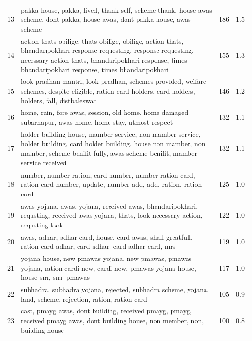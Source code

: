 \begin{table}[htbp]
\begin{tabular}{rlp{7cm}r}
13 & pakka house, pakka, lived, thank self, scheme thank, house awas scheme, dont pakka, house awas, dont pakka house, awas scheme & 186 & 1.5 \\
14 & action thats obilige, thats obilige, obilige, action thats, bhandaripokhari response requesting, response requesting, necessary action thats, bhandaripokhari response, times bhandaripokhari response, times bhandaripokhari & 155 & 1.3 \\
15 & look pradhan mantri, look pradhan, schemes provided, welfare schemes, despite eligible, ration card holders, card holders, holders, fall, distbaleswar & 146 & 1.2 \\
16 & home, rain, fore awas, session, old home, home damaged, subarnapur, awas home, home stay, utmost respect & 132 & 1.1 \\
17 & holder building house, mamber service, non mamber service, holder building, card holder building, house non mamber, non mamber, scheme benifit fully, awas scheme benifit, mamber service received & 132 & 1.1 \\
18 & number, number ration, card number, number ration card, ration card number, update, number add, add, ration, ration card & 125 & 1.0 \\
19 & awas yojana, awas, yojana, received awas, bhandaripokhari, requsting, received awas yojana, thats, look necessary action, requsting look & 122 & 1.0 \\
20 & awas, adhar, adhar card, house, card awas, shall greatfull, ration card adhar, card adhar, card adhar card, mrs & 119 & 1.0 \\
21 & yojana house, new pmawas yojana, new pmawas, pmawas yojana, ration cardi new, cardi new, pmawas yojana house, house siri, siri, pmawas & 117 & 1.0 \\
22 & subhadra, subhadra yojana, rejected, subhadra scheme, yojana, land, scheme, rejection, ration, ration card & 105 & 0.9 \\
23 & cast, pmayg awas, dont building, received pmayg, pmayg, received pmayg awas, dont building house, non member, non, building house & 100 & 0.8 \\
\bottomrule
\end{tabular}
\end{table}